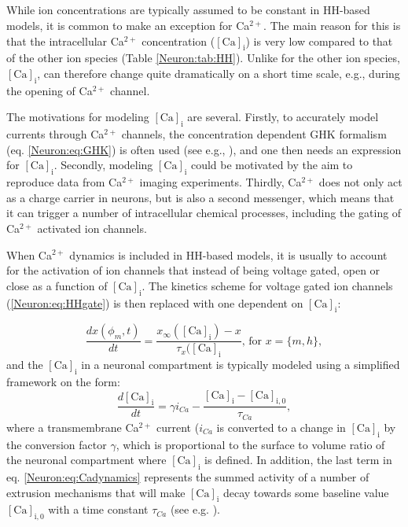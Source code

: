 \subsection{}
\label{sec:Neuron:Calcium}
While ion concentrations are typically assumed to be constant in HH-based models, it is common to make an exception for Ca$^{2+}$. The main reason for this is that the intracellular Ca$^{2+}$ concentration ($\mathrm{[Ca]_i}$) is very low compared to that of the other ion species (Table \ref{Neuron:tab:HH}). Unlike for the other ion species,  $\mathrm{[Ca]_i}$, can therefore change quite dramatically on a short time scale, e.g., during the opening of Ca$^{2+}$ channel. 

The motivations for modeling $\mathrm{[Ca]_i}$ are several. Firstly, to accurately model currents through Ca$^{2+}$ channels, the concentration dependent GHK formalism (eq. \ref{Neuron:eq:GHK}) is often used (see e.g., \cite{Destexhe1994,Zhu1999,Halnes2011}), and one then needs an expression for $\mathrm{[Ca]_i}$. Secondly, modeling $\mathrm{[Ca]_i}$ could be motivated by the aim to reproduce data from Ca$^{2+}$ imaging experiments. Thirdly, Ca$^{2+}$ does not only act as a charge carrier in neurons, but is also a second messenger, which means that it can trigger a number of intracellular chemical processes, including the gating of Ca$^{2+}$ activated ion channels. 

When Ca$^{2+}$ dynamics is included in HH-based models, it is usually to account for the activation of ion channels that instead of being voltage gated, open or close as a function of $\mathrm{[Ca]_i}$. The kinetics scheme for voltage gated ion channels (\ref{Neuron:eq:HHgate}) is then replaced with one dependent on $\mathrm{[Ca]_i}$:

\begin{equation}
\frac{dx(\phi_m,t)}{dt} = \frac{x_{\infty}(\mathrm{[Ca]_i}) - x}{\tau_x(\mathrm{[Ca]_i}},  \, \text{for } x = \{m,h\},
\label{Neuron:eq:Cagate}
\end{equation}
and the $\mathrm{[Ca]_i}$ in a neuronal compartment is typically modeled using a simplified framework on the form:
\begin{equation}
\frac{d\mathrm{[Ca]_i}}{dt} = \gamma i_{Ca} - \frac{\mathrm{[Ca]_i}-\mathrm{[Ca]_{i,0}}}{\tau_{Ca}}, 
\label{Neuron:eq:Cadynamics}
\end{equation}
where a transmembrane Ca$^{2+}$ current ($i_{Ca}$ is converted to a change in $\mathrm{[Ca]_i}$ by the conversion factor $\gamma$, which is proportional to the surface to volume ratio of the neuronal compartment where $\mathrm{[Ca]_i}$ is defined. In addition, the last term in eq. \ref{Neuron:eq:Cadynamics} represents the summed activity of a number of extrusion mechanisms that will make $\mathrm{[Ca]_i}$ decay towards some baseline value $\mathrm{[Ca]_{i,0}}$ with a time constant $\tau_{Ca}$ (see e.g. \cite{Sterratt2011}).

